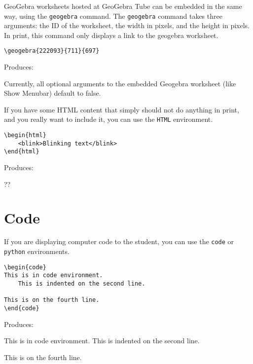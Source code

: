 \documentclass{ximera}
\begin{document}
\begin{example} GeoGebra worksheets hosted at GeoGebra Tube can be embedded in the same way, using the \verb!geogebra! command. The \verb!geogebra! command takes three arguments: the ID of the worksheet, the width in pixels, and the height in pixels. In print, this command only displays a link to the geogebra worksheet.

\begin{verbatim}
\geogebra{222093}{711}{697}
\end{verbatim}

Produces: 


\begin{remark} 
  Currently, all optional arguments to the embedded Geogebra worksheet (like Show Menubar) default to false.
\end{remark}

\end{example}

\begin{example} If you have some HTML content that simply should not do anything in print, and you really want to include it, you can use the \verb!HTML! environment. 

\begin{verbatim}
\begin{html}
    <blink>Blinking text</blink> 
\end{html}
\end{verbatim}

Produces: 

??

\end{example}


\section{Code} \label{CodeAnswers}

\begin{example}
If you are displaying computer code to the student, you can use the \verb!code! or \verb!python! environments.

\begin{verbatim}
\begin{code}
This is in code environment.
    This is indented on the second line.

This is on the fourth line.
\end{code}
\end{verbatim}

Produces:

\begin{code}
This is in code environment.
    This is indented on the second line.

This is on the fourth line.
\end{code}
\end{example}
\end{document}
